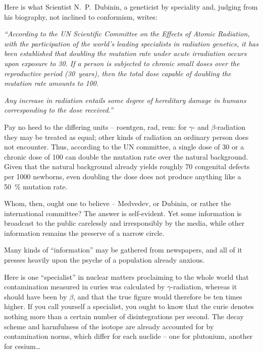 \documentclass[openright]{bookest}
\begin{document}
Here is what Scientist N.~P.~Dubinin, a geneticist by speciality and, judging from his biography, not inclined to conformism, writes:

\begin{personal}
\textit{``According to the UN Scientific Committee on the Effects of Atomic Radiation, with the participation of the world's leading specialists in radiation genetics, it has been established that doubling the mutation rate under acute irradiation occurs upon exposure to \qty{30}{\roentgen}. If a person is subjected to chronic small doses over the reproductive period (30~years), then the total dose capable of doubling the mutation rate amounts to \qty{100}{\roentgen}.}

\textit{Any increase in radiation entails some degree of hereditary damage in humans corresponding to the dose received.''}
\end{personal}

Pay no heed to the differing units -- roentgen, rad, rem: for $\gamma$- and $\beta$-radiation they may be treated as equal; other kinds of radiation an ordinary person does not encounter. Thus, according to the UN committee, a single dose of \qty{30}{\roentgen} or a chronic dose of \qty{100}{\roentgen} can double the mutation rate over the natural background. Given that the natural background already yields roughly \num{70} congenital defects per \num{1000} newborns, even doubling the dose does not produce anything like a \qty{50}{\percent} mutation rate.

Whom, then, ought one to believe -- Medvedev, or Dubinin, or rather the international committee? The answer is self-evident. Yet some information is broadcast to the public carelessly and irresponsibly by the media, while other information remains the preserve of a narrow circle.

Many kinds of ``information'' may be gathered from newspapers, and all of it presses heavily upon the psyche of a population already anxious.

Here is one ``specialist'' in nuclear matters proclaiming to the whole world that contamination measured in curies was calculated by $\gamma$-radiation, whereas it should have been by $\beta$, and that the true figure would therefore be ten times higher. If you call yourself a specialist, you ought to know that the curie denotes nothing more than a certain number of disintegrations per second. The decay scheme and harmfulness of the isotope are already accounted for by contamination norms, which differ for each nuclide -- one for plutonium, another for cesium\ldots
\end{document}
